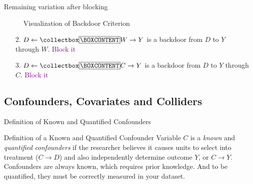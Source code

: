 \documentclass{beamer}
\begin{document}
\begin{frame}{Remaining variation after blocking}

\begin{figure}
\begin{center}
\caption{Visualization of Backdoor Criterion}
\label{fig:backdoor_dag}
\end{center}
\end{figure}

\bigskip

\begin{enumerate}
\item[2. ] $D\leftarrow \mybox{W} \rightarrow Y$ is a backdoor from $D$ to $Y$ through $W$. \textcolor{purple}{Block it}
\item[3. ] $D\leftarrow \mybox{C} \rightarrow Y$ is a backdoor from $D$ to $Y$ through $C$. \textcolor{purple}{Block it}
\end{enumerate}
\end{frame}


\subsection{Confounders, Covariates and Colliders}

\begin{frame}{Definition of Known and Quantified Confounders}
	
	
	\begin{block}{Definition of a Known and Quantified Confounder}
	Variable $C$ is a \emph{known} and \emph{quantified} \emph{confounders} if the researcher believes it causes units to select into treatment ($C \rightarrow D$) and also independently determine outcome $Y$, or $C \rightarrow Y$. Confounders are always known, which requires prior knowledge. And to be quantified, they must be correctly measured in your dataset.
	\end{block}
	
	
\end{frame}
\end{document}
